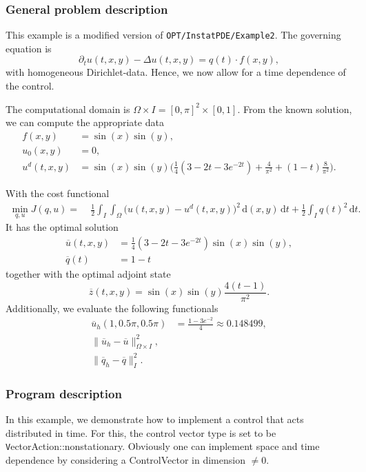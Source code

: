 \subsubsection{General problem description}

This example is a modified version of \texttt{OPT/InstatPDE/Example2}. 
The governing equation is
\begin{equation*}
\partial_t u(t,x,y) - \Delta u(t,x,y) = q(t)\cdot f(x,y),
\end{equation*}
with homogeneous Dirichlet-data. Hence, we now allow for a time dependence of the control. 

The computational domain is $\Omega \times I = [0,\pi]^2 \times [0,1]$. From the known solution, we can compute the appropriate data 
\begin{align*}
f(x,y) &= \sin(x)\sin(y),\\
u_0(x,y) &= 0,\\
u^d(t,x,y)&= \sin(x)\sin(y) \bigl(\tfrac{1}{4}(3-2t-3e^{-2t}) + \tfrac{4}{\pi^2} + (1-t)\tfrac{8}{\pi^2}\bigr).
\end{align*}

With the cost functional 
\begin{align*}
 \min_{q,u} J(q,u) =&\; \frac{1}{2}\int_I\int_{\Omega} \bigl(u(t,x,y) - u^d(t,x,y)\bigr)^2\,\mathrm{d}(x,y)\,\mathrm{d}t + \frac{1}{2} \int_{I} q(t)^2\,\mathrm{d}t.
\end{align*}
It has the optimal solution 
\begin{align*}
\overline{u}(t,x,y) &= \tfrac{1}{4}(3-2t-3e^{-2t})\sin(x) \sin(y),\\
\overline{q}(t) &= 1-t 
\end{align*}
together with the optimal adjoint state 
\[
 \overline{z}(t,x,y) = \sin(x) \sin(y) \frac{4(t-1)}{\pi^2}.
\]
Additionally, we evaluate the following functionals
\begin{align*}
  \overline{u}_h(1,0.5\pi,0.5\pi) &= \frac{1-3e^{-2}}{4} \approx 0.148499,\\
  \| \overline{u}_h - \overline{u}\|^2_{\Omega \times I},& \\
  \| \overline{q}_h - \overline{q}\|^2_I. &  
\end{align*}

\subsubsection{Program description}
In this example, we demonstrate how to implement a control that acts distributed in time. 
For this, the control vector type is set to be 
{\texttt VectorAction::nonstationary}. 
Obviously one can implement space and time dependence by considering a ControlVector in
dimension $\ne 0$.
